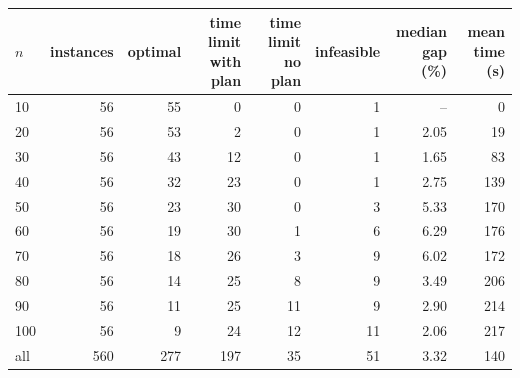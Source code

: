 \begin{tabular}{lrrrrrrr}\toprule
$n$ & instances & optimal & \shortstack{time limit\\with plan} & \shortstack{time limit\\no plan} & infeasible & \shortstack{median\\gap (\%)} & \shortstack{mean\\time (s)} \\ \midrule
10 & 56 & 55 & 0 & 0 & 1 & -- & 0 \\
20 & 56 & 53 & 2 & 0 & 1 & 2.05 & 19 \\
30 & 56 & 43 & 12 & 0 & 1 & 1.65 & 83 \\
40 & 56 & 32 & 23 & 0 & 1 & 2.75 & 139 \\
50 & 56 & 23 & 30 & 0 & 3 & 5.33 & 170 \\
60 & 56 & 19 & 30 & 1 & 6 & 6.29 & 176 \\
70 & 56 & 18 & 26 & 3 & 9 & 6.02 & 172 \\
80 & 56 & 14 & 25 & 8 & 9 & 3.49 & 206 \\
90 & 56 & 11 & 25 & 11 & 9 & 2.90 & 214 \\
100 & 56 & 9 & 24 & 12 & 11 & 2.06 & 217 \\
\midrule all & 560 & 277 & 197 & 35 & 51 & 3.32 & 140 \\
\bottomrule\end{tabular}
